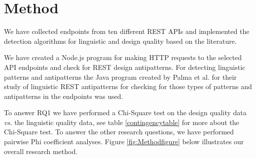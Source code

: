 \section{Method}\label{sec:Method}

We have collected endpoints from ten different REST APIs and implemented the detection algorithms for linguistic and design quality based on the literature. 

We have created a Node.js program for making HTTP requests to the selected API endpoints and check for REST design antipatterns. For detecting linguistic patterns and antipatterns the Java program created by Palma et al. for their study of linguistic REST antipatterns \cite{linguistic} for checking for those types of patterns and antipatterns in the endpoints was used. 

To answer RQ1 we have performed a Chi-Square test on the design quality data \textit{vs.} the linguistic quality data, see table \ref{contingencytable} for more about the Chi-Square test. To answer the other research questions, we have performed pairwise Phi coefficient analyses. Figure \ref{fig:Methodfigure} below illustrates our overall research method. 

